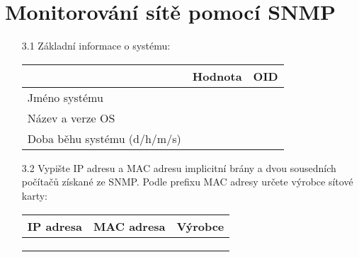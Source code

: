 \documentclass[a4paper,11pt]{article}
\begin{document}
\section{Monitorování sítě pomocí SNMP}
\begin{itemize}
  \item [3.1] Základní informace o systému:
  
      \begin{tabular}{|l|p{6cm}|p{4cm}|}
        \hline
        & \bf Hodnota & \bf \bf OID\\
        \hline
        Jméno systému & & \\
        \hline
        Název a verze OS & & \\
        \hline
        Doba běhu systému (d/h/m/s) &&\\
        \hline
    \end{tabular}
    \item [3.2] Vypište IP adresu a MAC adresu implicitní brány a dvou sousedních počítačů získané ze SNMP. Podle prefixu MAC adresy určete výrobce sítové karty:
    
\begin{tabular}{|p{4cm}|p{6cm}|p{52mm}|}
\hline
\bf IP adresa  & \bf MAC adresa & \bf Výrobce   \\ \hline
  &    &     \\   \hline
  &    &     \\   \hline
  &    &     \\   \hline
\end{tabular}
\end{itemize}
\end{document}
